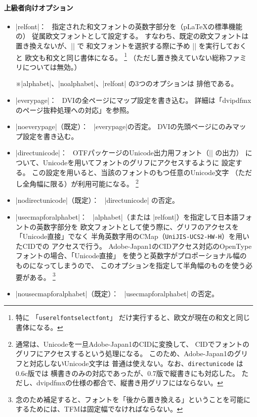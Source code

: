 \documentclass[a4paper,uplatex]{jsarticle}
\newcommand{\Pkg}[1]{\textsf{#1}}
\newcommand{\Note}{\par\noindent ※}
\newcommand{\Means}{：\ }
\providecommand{\pLaTeX}{p\LaTeX}
\begin{document}
\paragraph{上級者向けオプション}
\begin{itemize}
\item |relfont|\Means
  指定された和文フォントの英数字部分を（{\pLaTeX}の標準機能の）
  従属欧文フォントとして設定する。
  すなわち、既定の欧文フォントは置き換えないが、|\selectfont| で
  和文フォントを選択する際に予め |\userelfont| を実行しておくと
  欧文も和文と同じ書体になる。
  \inhibitglue\footnote{特に
  「\texttt{userelfontselectfont}」
  だけ実行すると、欧文が現在の和文と同じ書体になる。}
  （ただし置き換えていない総称ファミリについては無効。）
  \Note |alphabet|、|noalphabet|、|relfont| の3つのオプションは
  排他である。
\item |everypage|\Means
  DVIの全ページにマップ設定を書き込む。
  詳細は「dvipdfmx のページ抜粋処理への対応」を参照。
\item |noeverypage|（既定）\Means
  |everypage|の否定。
  DVIの先頭ページにのみマップ設定を書き込む。
\item |directunicode|\Means
  \Pkg{OTF}パッケージのUnicode出力用フォント（|\UTF{}| の出力）
  について、Unicodeを用いてフォントのグリフにアクセスするように
  設定する。
  この設定を用いると、当該のフォントのもつ任意のUnicode文字
  （ただし全角幅に限る）が利用可能になる。
  \footnote{通常は、Unicodeを一旦Adobe-Japan1のCIDに変換して、
  CIDでフォントのグリフにアクセスするという処理になる。
  このため、Adobe-Japan1のグリフと対応しないUnicode文字は
  普通は使えない。なお、\texttt{directunicode} は0.6c版では
  横書きのみの対応であったが、0.7版で縦書きにも対応した。
  ただし、dvipdfmxの仕様の都合で、縦書き用グリフにはならない。}
\item |nodirectunicode|（既定）\Means
  |directunicode| の否定。
\item |usecmapforalphabet|\Means
  |alphabet|（または |relfont|）を指定して日本語フォントの英数字部分を
  欧文フォントとして使う際に、グリフのアクセスを「Unicode直接」でなく
  半角英数字用のCMap（\texttt{UniJIS-UCS2-HW-H}）を用いたCIDでの
  アクセスで行う。
  Adobe-Japan1のCIDアクセス対応のOpenTypeフォントの場合、「Unicode直接」
  を使うと英数字がプロポーショナル幅のものになってしまうので、
  このオプションを指定して半角幅のものを使う必要がある。
  \inhibitglue\footnote{%
  念のため補足すると、フォントを「後から置き換える」ということを可能に
  するためには、TFMは固定幅でなければならない。}
\item |nousecmapforalphabet|（既定）\Means
  |usecmapforalphabet| の否定。
\end{itemize}
\end{document}
